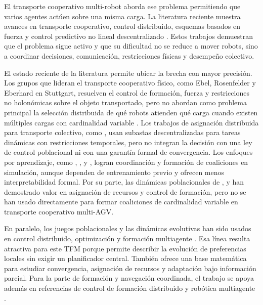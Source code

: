 \documentclass[11pt,a4paper]{article}
\begin{document}
El transporte cooperativo multi-robot aborda ese problema permitiendo que varios agentes actúen sobre una misma carga. La literatura reciente muestra avances en transporte cooperativo, control distribuido, esquemas basados en fuerza y control predictivo no lineal descentralizado \citep{an2023cooperative,verginis2018communication,ebel2024cooperative,rosenfelder2024force}. Estos trabajos demuestran que el problema sigue activo y que su dificultad no se reduce a mover robots, sino a coordinar decisiones, comunicación, restricciones físicas y desempeño colectivo.

El estado reciente de la literatura permite ubicar la brecha con mayor precisión. Los grupos que lideran el transporte cooperativo físico, como Ebel, Rosenfelder y Eberhard en Stuttgart, resuelven el control de formación, fuerza y restricciones no holonómicas sobre el objeto transportado, pero no abordan como problema principal la selección distribuida de qué robots atienden qué carga cuando existen múltiples cargas con cardinalidad variable \citep{ebel2024cooperative,rosenfelder2024force}. Los trabajos de asignación distribuida para transporte colectivo, como \citet{shan2024distributed}, usan subastas descentralizadas para tareas dinámicas con restricciones temporales, pero no integran la decisión con una ley de control poblacional ni con una garantía formal de convergencia. Los enfoques por aprendizaje, como \citet{shibata2023event}, \citet{shibata2023learning}, \citet{paul2023efficient} y \citet{bezerra2025learning}, logran coordinación y formación de coaliciones en simulación, aunque dependen de entrenamiento previo y ofrecen menos interpretabilidad formal. Por su parte, las dinámicas poblacionales de \citet{quijano2017population}, \citet{barreiro2017distributed} y \citet{martinez2020formation} han demostrado valor en asignación de recursos y control de formación, pero no se han usado directamente para formar coaliciones de cardinalidad variable en transporte cooperativo multi-AGV.

En paralelo, los juegos poblacionales y las dinámicas evolutivas han sido usados en control distribuido, optimización y formación multiagente \citep{barreiro2017distributed,barreiro2021uav,quijano2017population,sandholm2010population,martinez2020formation,martinez2022contractive}. Esa línea resulta atractiva para este TFM porque permite describir la evolución de preferencias locales sin exigir un planificador central. También ofrece una base matemática para estudiar convergencia, asignación de recursos y adaptación bajo información parcial. Para la parte de formación y navegación coordinada, el trabajo se apoya además en referencias de control de formación distribuido y robótica multiagente \citep{bullo2009distributed,ahn2020formation,hurtado2024potential}.
\end{document}

